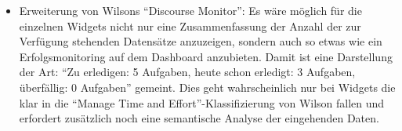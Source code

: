 \begin{itemize}
 \item Erweiterung von Wilsons "`Discourse Monitor"': Es wäre möglich für die einzelnen Widgets nicht nur eine Zusammenfassung der Anzahl der zur Verfügung stehenden Datensätze anzuzeigen, sondern auch so etwas wie ein Erfolgsmonitoring auf dem Dashboard anzubieten. Damit ist eine Darstellung der Art: "`Zu erledigen: 5 Aufgaben, heute schon erledigt: 3 Aufgaben, überfällig: 0 Aufgaben"' gemeint. Dies geht wahrscheinlich nur bei Widgets die klar in die “Manage Time and Effort”-Klassifizierung von Wilson fallen und erfordert zusätzlich noch eine semantische Analyse der eingehenden Daten.
\end{itemize}




